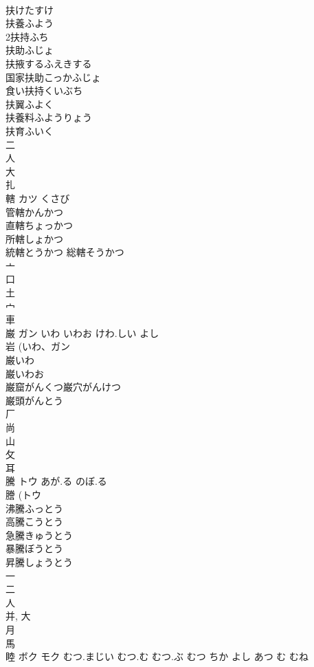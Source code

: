 \documentclass[8pt]{extreport}
\begin{document}
\begin{CJK}{UTF8}{min}
\\	扶けたすけ
\\	扶養ふよう
\\	2扶持ふち
\\	扶助ふじょ
\\	扶掖するふえきする
\\	国家扶助こっかふじょ
\\	食い扶持くいぶち
\\	扶翼ふよく
\\	扶養料ふようりょう
\\	扶育ふいく
\\	二 
\\	人 
\\	大 
\\	扎	
\\	轄	カツ	くさび	
\\	管轄かんかつ 
\\	直轄ちょっかつ 
\\	所轄しょかつ 
\\	統轄とうかつ 総轄そうかつ 
\\	亠 
\\	口 
\\	土 
\\	宀 
\\	車 
\\	巌	ガン	いわ いわお けわ.しい よし	
\\	岩 (いわ、ガン 
\\	巌いわ
\\	巌いわお
\\	巌窟がんくつ巌穴がんけつ
\\	巌頭がんとう
\\	厂 
\\	尚 
\\	山 
\\	攵 
\\	耳 
\\	騰	トウ	あが.る のぼ.る	
\\	謄 (トウ 
\\	沸騰ふっとう
\\	高騰こうとう
\\	急騰きゅうとう
\\	暴騰ぼうとう
\\	昇騰しょうとう
\\	一 
\\	二 
\\	人 
\\	并, 大 
\\	月 
\\	馬 
\\	睦	ボク モク	むつ.まじい むつ.む むつ.ぶ むつ ちか よし あつ む むね	

\end{CJK}
\end{document}
